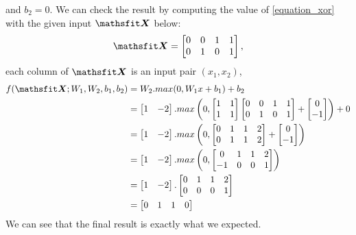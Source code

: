 and $\displaystyle b_2 = 0$. We can check the result by computing the value of \eqref{equation_xor} with the given input $\displaystyle \tX$ below:
\[ \tX = 
\begin{bmatrix}
    0 & 0 & 1 & 1 \\
    0 & 1 & 0 & 1
\end{bmatrix}, \]
each column of $\displaystyle \tX$ is an input pair $\displaystyle (x_1, x_2)$,
\begin{align*}
    f(\tX; W_1, W_2, b_1, b_2) &= W_2.max(0, W_1x + b_1) + b_2 \\
    {} &= \begin{bmatrix}
            1 & -2
          \end{bmatrix}.max \left(0, 
            \begin{bmatrix}
                1 & 1 \\
                1 & 1
            \end{bmatrix} \begin{bmatrix}
                0 & 0 & 1 & 1 \\
                0 & 1 & 0 & 1
            \end{bmatrix} + \begin{bmatrix}
                0 \\
                -1
            \end{bmatrix}\right) + 0 \\
    {} &= \begin{bmatrix}
        1 & -2
      \end{bmatrix}.max \left(0, 
        \begin{bmatrix}
            0 & 1 & 1 & 2 \\
            0 & 1 & 1 & 2
        \end{bmatrix} + \begin{bmatrix}
            0 \\
            -1
        \end{bmatrix}\right) \\
    {} &= \begin{bmatrix}
        1 & -2
        \end{bmatrix}.max \left(0, 
        \begin{bmatrix}
            0 & 1 & 1 & 2 \\
            -1 & 0 & 0 & 1
        \end{bmatrix}\right) \\
    {} &= \begin{bmatrix}
        1 & -2
        \end{bmatrix}.\begin{bmatrix}
            0 & 1 & 1 & 2 \\
            0 & 0 & 0 & 1
        \end{bmatrix}\\
    {} &= \begin{bmatrix}
        0 & 1 & 1 & 0
        \end{bmatrix}
\end{align*}
We can see that the final result is exactly what we expected.



